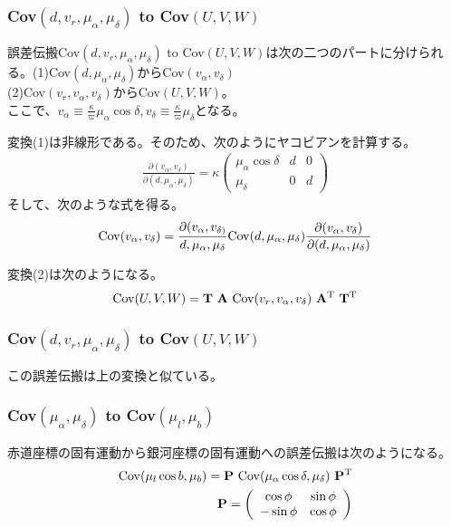 \subsubsection{Cov$(d,v_r,\mu_{\alpha},\mu_{\delta})$ to Cov$(U,V,W)$}
誤差伝搬Cov$(d,v_r,\mu_{\alpha},\mu_{\delta})$ to Cov$(U,V,W)$は次の二つのパートに分けられる。(1)Cov$(d,\mu_{\alpha},\mu_{\delta})$からCov$(v_{\alpha},v_{\delta})$\\
(2)Cov$(v_r,v_{\alpha},v_{\delta})$からCov$(U,V,W)$。\\
ここで、$v_{\alpha} \equiv \frac{\kappa}{\varpi} \mu_{\alpha} \cos \delta, v_{\delta} \equiv \frac{\kappa}{\varpi}\mu_{\delta}$となる。

変換(1)は非線形である。そのため、次のようにヤコビアンを計算する。
\begin{align}
    \frac{\partial(v_{\alpha}, v_{\delta})}{\partial(d,\mu_{\alpha},\mu_{\delta})} = \kappa
    \left(
	\begin{array}{ccc}
	 	\mu_{\alpha} \cos \delta & d & 0 \\
	 	\mu_{\delta} & 0 & d
	\end{array}
	\right)
\end{align}
そして、次のような式を得る。
\begin{align}
    {\rm Cov}(v_{\alpha},v_{\delta}) = \frac{\partial(v_{\alpha},v_{\delta)}}{d,\mu_{\alpha},\mu_{\delta}} {\rm Cov}(d,\mu_{\alpha},\mu_{\delta}) \frac{\partial(v_{\alpha},v_{\delta})}{\partial(d,\mu_{\alpha},\mu_{\delta})}
\end{align}

変換(2)は次のようになる。
\begin{align}
    {\rm Cov}(U,V,W) = \mathbf{T \ A} \ {\rm Cov}(v_r,v_{\alpha},v_{\delta}) \ \mathbf{A^{\rm T} \ T^{\rm T}}
\end{align}

\subsubsection{Cov$(d,v_r,\mu_{\alpha},\mu_{\delta})$ to Cov$(U,V,W)$}
この誤差伝搬は上の変換と似ている。

\subsubsection{Cov$(\mu_{\alpha},\mu_{\delta})$ to Cov$(\mu_l,\mu_b)$}
赤道座標の固有運動から銀河座標の固有運動への誤差伝搬は次のようになる。
\begin{align}
\begin{aligned}
    {\rm Cov}(\mu_l \cos b,\mu_b) = \mathbf{P} \ {\rm Cov}(\mu_{\alpha} \cos{\delta},\mu_{\delta}) \ \mathbf{P^{\rm T}} \\
    \mathbf{P} = 
    \left(
	\begin{array}{cc}
	 	\cos \phi & \sin \phi \\
	 	-\sin \phi & \cos \phi
	\end{array}
	\right)
\end{aligned}
\end{align}





